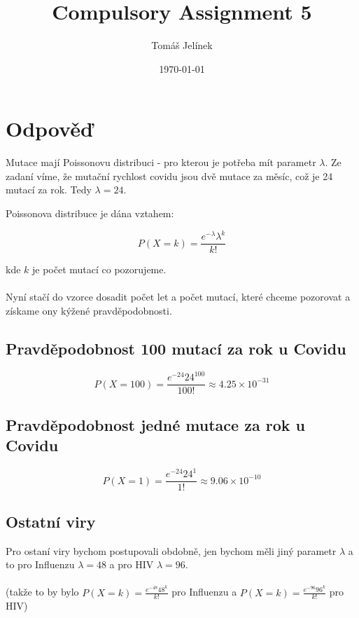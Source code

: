 \documentclass{article}
\title{Compulsory Assignment 5}
\author{Tomáš Jelínek}
\date{\today}
\begin{document}
\maketitle

\section*{Odpověď}

Mutace mají Poissonovu distribuci - pro kterou je potřeba mít parametr $\lambda$.
Ze zadaní víme, že mutační rychlost covidu jsou dvě mutace za měsíc, což je 24 mutací za rok.
Tedy $\lambda = 24$.

Poissonova distribuce je dána vztahem:

\begin{equation}
    P(X=k) = \frac{e^{-\lambda} \lambda^k}{k!}
\end{equation}

kde $k$ je počet mutací co pozorujeme.
\\
\\
Nyní stačí do vzorce dosadit počet let a počet mutací, které chceme pozorovat a získame ony kýžené pravděpodobnosti.

\subsection*{Pravděpodobnost 100 mutací za rok u Covidu}

\begin{equation}
    P(X=100) = \frac{e^{-24} 24^{100}}{100!} \approx 4.25 \times 10^{-31}
\end{equation}

\subsection*{Pravděpodobnost jedné mutace za rok u Covidu}

\begin{equation}
    P(X=1) = \frac{e^{-24} 24^{1}}{1!} \approx 9.06 \times 10^{-10}
\end{equation}

\subsection*{Ostatní viry}

Pro ostaní viry bychom postupovali obdobně, jen bychom měli jiný parametr $\lambda$ a to pro Influenzu $\lambda = 48$ a pro HIV $\lambda = 96$.
\\
\\
(takže to by bylo $P(X=k) = \frac{e^{-48} 48^k}{k!}$ pro Influenzu a $P(X=k) = \frac{e^{-96} 96^k}{k!}$ pro HIV)
\end{document}
